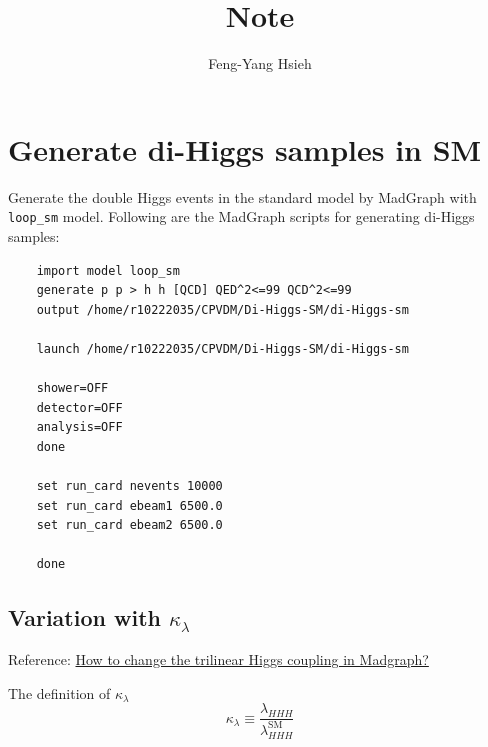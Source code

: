\documentclass[12pt]{article}
\title{Note}
\author{Feng-Yang Hsieh}
\date{}
\begin{document}
\maketitle
\section{Generate di-Higgs samples in SM}%
\label{sec:generate_di_higgs_samples_in_sm}
	Generate the double Higgs events in the standard model by MadGraph with \verb+loop_sm+ model. Following are the MadGraph scripts for generating di-Higgs samples:
	\begin{verbatim}
	import model loop_sm
	generate p p > h h [QCD] QED^2<=99 QCD^2<=99
	output /home/r10222035/CPVDM/Di-Higgs-SM/di-Higgs-sm

	launch /home/r10222035/CPVDM/Di-Higgs-SM/di-Higgs-sm

	shower=OFF
	detector=OFF
	analysis=OFF
	done

	set run_card nevents 10000
	set run_card ebeam1 6500.0
	set run_card ebeam2 6500.0

	done
	\end{verbatim}

	\subsection{Variation with \texorpdfstring{$\kappa_\lambda$}{kappa_lambda}}%
	\label{sub:variation_with_kappa_lambda}
		Reference: \href{https://answers.launchpad.net/mg5amcnlo/+question/678406}{How to change the trilinear Higgs coupling in Madgraph?}

		The definition of $\kappa_\lambda$
		\begin{equation}
			\kappa_\lambda \equiv \frac{\lambda_{HHH}}{\lambda_{HHH}^{\text{SM}}}
		\end{equation}
\end{document}
